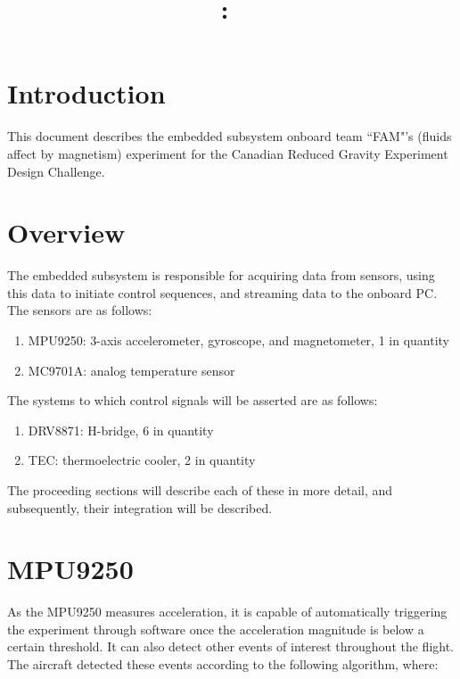 \documentclass{article}
\title{
	\vspace{2in}
	\textmd{\textbf{\compName:\ \docTitle}}\\
	\vspace{0.1in}
	\vspace{3in}
}
\author{\textbf{\authorName}}
\begin{document}
\maketitle
\clearpage

%
%
%
%

\section*{Introduction} \label{intro}
This document describes the embedded subsystem onboard team ``FAM"'s (fluids affect by magnetism) experiment for the Canadian Reduced Gravity Experiment Design Challenge.

\clearpage

%
%
%
%

\tableofcontents
\clearpage


%
%
%
%

\section{Overview} \label{overview}
The embedded subsystem is responsible for acquiring data from sensors, using this data to initiate control sequences, and streaming data to the onboard PC. The sensors are as follows:

\begin{enumerate}
	\item MPU9250: 3-axis accelerometer, gyroscope, and magnetometer, 1 in quantity
	\item MC9701A: analog temperature sensor
\end{enumerate}

The systems to which control signals will be asserted are as follows:

\begin{enumerate}
	\item DRV8871: H-bridge, 6 in quantity
	\item TEC: thermoelectric cooler, 2 in quantity
\end{enumerate}

The proceeding sections will describe each of these in more detail, and subsequently, their integration will be described.

\clearpage

%
%
%
%

\section{MPU9250} \label{MPU}
As the MPU9250 measures acceleration, it is capable of automatically triggering the experiment through software once the acceleration magnitude is below a certain threshold. It can also detect other events of interest throughout the flight. The aircraft detected these events according to the following algorithm, where:
\end{document}

